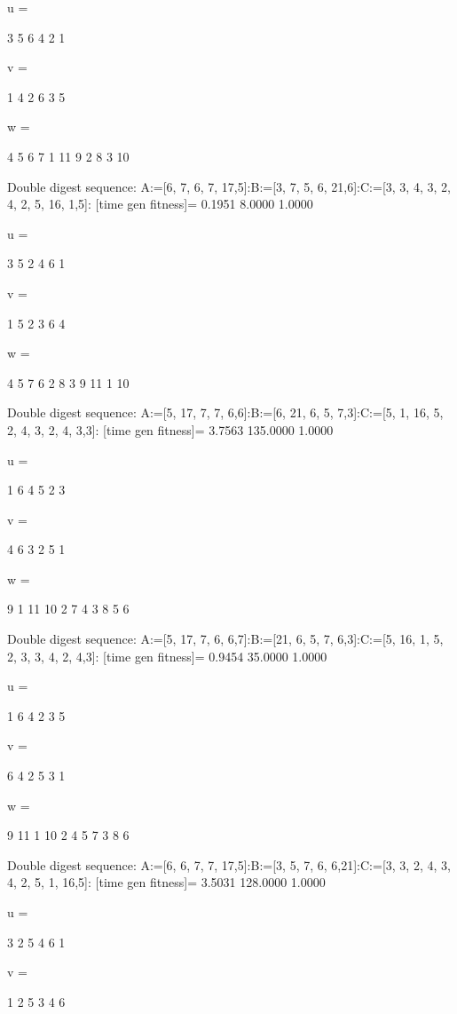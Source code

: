 u =

     3     5     6     4     2     1


v =

     1     4     2     6     3     5


w =

     4     5     6     7     1    11     9     2     8     3    10

Double digest sequence:
A:=[6, 7, 6, 7, 17,5]:B:=[3, 7, 5, 6, 21,6]:C:=[3, 3, 4, 3, 2, 4, 2, 5, 16, 1,5]:
[time gen fitness]=
    0.1951    8.0000    1.0000


u =

     3     5     2     4     6     1


v =

     1     5     2     3     6     4


w =

     4     5     7     6     2     8     3     9    11     1    10

Double digest sequence:
A:=[5, 17, 7, 7, 6,6]:B:=[6, 21, 6, 5, 7,3]:C:=[5, 1, 16, 5, 2, 4, 3, 2, 4, 3,3]:
[time gen fitness]=
    3.7563  135.0000    1.0000


u =

     1     6     4     5     2     3


v =

     4     6     3     2     5     1


w =

     9     1    11    10     2     7     4     3     8     5     6

Double digest sequence:
A:=[5, 17, 7, 6, 6,7]:B:=[21, 6, 5, 7, 6,3]:C:=[5, 16, 1, 5, 2, 3, 3, 4, 2, 4,3]:
[time gen fitness]=
    0.9454   35.0000    1.0000


u =

     1     6     4     2     3     5


v =

     6     4     2     5     3     1


w =

     9    11     1    10     2     4     5     7     3     8     6

Double digest sequence:
A:=[6, 6, 7, 7, 17,5]:B:=[3, 5, 7, 6, 6,21]:C:=[3, 3, 2, 4, 3, 4, 2, 5, 1, 16,5]:
[time gen fitness]=
    3.5031  128.0000    1.0000


u =

     3     2     5     4     6     1


v =

     1     2     5     3     4     6


